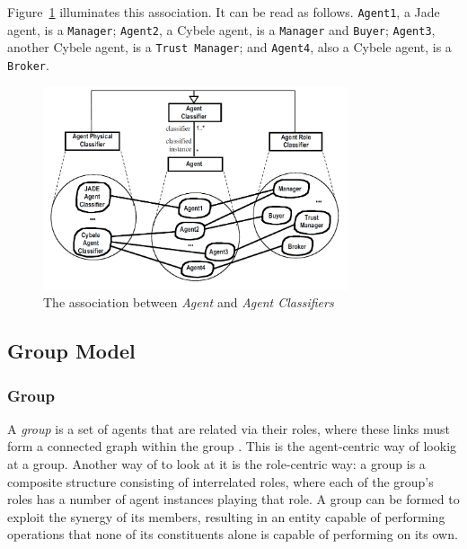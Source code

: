 Figure~\ref{figure:onp-agent-agent-classifier-association} illuminates this association.
It can be read as follows. \texttt{Agent1}, a Jade agent, is a \texttt{Manager}; \texttt{Agent2}, a Cybele agent, is a \texttt{Manager} and \texttt{Buyer}; \texttt{Agent3}, another Cybele agent, is a \texttt{Trust Manager}; and \texttt{Agent4}, also a Cybele agent, is a \texttt{Broker}.

\begin{figure}[ht]
	\centering
	\includegraphics[width=0.8\textwidth]{images/onp/agent-agent-classifier-association.png}
	\caption{The association between \textit{Agent} and \textit{Agent Classifiers} \cite{Odell05}}
	\label{figure:onp-agent-agent-classifier-association}
\end{figure}

\subsection{Group Model}

\subsubsection*{Group}

A \textit{group} is a set of agents that are related via their roles, where these links must form
a connected graph within the group \cite{Odell05}.
This is the agent-centric way of lookig at a group.
Another way of to look at it is the role-centric way: a group is a composite structure consisting of interrelated roles, where each of the group's roles has a number of agent instances \cite{Odell05} playing that role.
A group can be formed to exploit the synergy of its members, resulting in an entity capable of performing operations that none of its constituents alone is capable of performing on its own.

